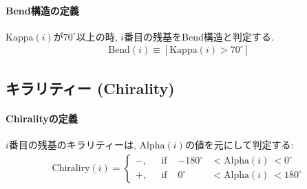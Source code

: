 \paragraph{Bend構造の定義}
$\mathrm{Kappa}(i)$が$70^{\circ}$以上の時, $i$番目の残基をBend構造と判定する.
\begin{align}
 \mathrm{Bend}(i)
 \equiv
 [
  \mathrm{Kappa} (i) > 70^{\circ}
 ]
\end{align}

\subsection{キラリティー (Chirality)}
\paragraph{Chiralityの定義}
$i$番目の残基のキラリティーは, $\mathrm{Alpha}(i)$の値を元にして判定する:
\begin{align}
 \mathrm{Chiraliry} (i)
 =
 \left\{
 \begin{array}{ccrl}
  -, & ~~~\textrm{if~} &-180^{\circ}& < \mathrm{Alpha}(i)~ < 0^{\circ} \\
  +, & ~~~\textrm{if~} &   0^{\circ}& < \mathrm{Alpha}(i)~ < 180^{\circ}
 \end{array} 
 \right.
\end{align}




